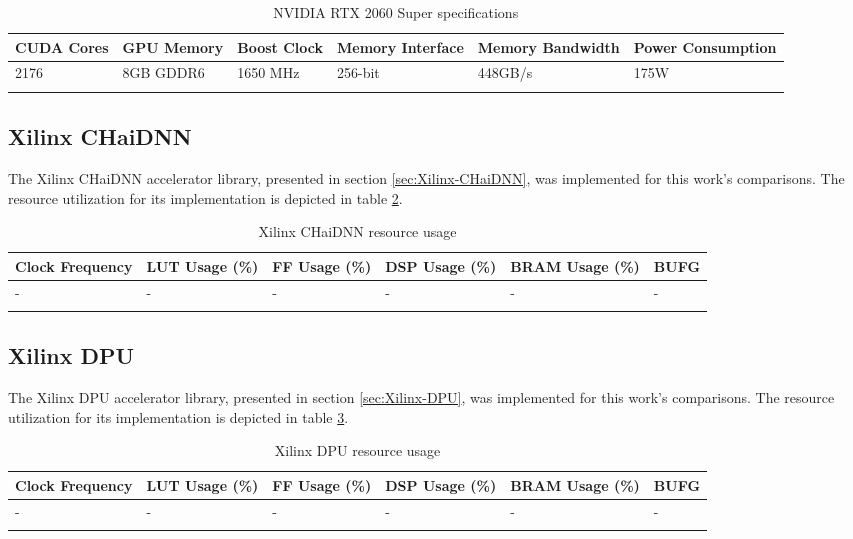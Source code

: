\begin{table}[H]
	\caption{NVIDIA RTX 2060 Super specifications}
	\label{tab:NVIDIA-RTX-2060-Super-specs}
	\centering
	\begin{tabular}{p{1cm} p{2cm} p{1cm} p{2cm} p{2.5cm} p{2.5cm}}
		\toprule
		\textbf{CUDA Cores} & \textbf{GPU Memory} & \textbf{Boost Clock} & \textbf{Memory Interface} & \textbf{Memory Bandwidth} & \textbf{Power Consumption}\\
		\midrule
			2176 & 8GB GDDR6 & 1650 MHz & 256-bit & 448GB/s & 175W\\
		\bottomrule\\
	\end{tabular}
\end{table}

\subsection{Xilinx CHaiDNN}
The Xilinx CHaiDNN accelerator library, presented in section \ref{sec:Xilinx-CHaiDNN}, was implemented for this work's comparisons. The resource utilization for its implementation is depicted in table \ref{tab:CHaiDNN-resource-usage}.

\begin{table}[H]
	\caption{Xilinx CHaiDNN resource usage}
	\label{tab:CHaiDNN-resource-usage}
	\centering
	\begin{tabular}{p{2cm} p{2cm} p{2cm} p{2cm} p{2cm} p{2cm}}
		\toprule
		\textbf{Clock Frequency} & \textbf{LUT Usage (\%)} & \textbf{FF Usage (\%)} & \textbf{DSP Usage (\%)} & \textbf{BRAM Usage (\%)} & \textbf{BUFG}\\
		\midrule
			- & - & - & - & - & -\\
		\bottomrule\\
	\end{tabular}
\end{table}

\subsection{Xilinx DPU}
The Xilinx DPU accelerator library, presented in section \ref{sec:Xilinx-DPU}, was implemented for this work's comparisons. The resource utilization for its implementation is depicted in table \ref{tab:DPU-resource-usage}.

\begin{table}[H]
	\caption{Xilinx DPU resource usage}
	\label{tab:DPU-resource-usage}
	\centering
	\begin{tabular}{p{2cm} p{2cm} p{2cm} p{2cm} p{2cm} p{2cm}}
		\toprule
		\textbf{Clock Frequency} & \textbf{LUT Usage (\%)} & \textbf{FF Usage (\%)} & \textbf{DSP Usage (\%)} & \textbf{BRAM Usage (\%)} & \textbf{BUFG}\\
		\midrule
			- & - & - & - & - & -\\
		\bottomrule\\
	\end{tabular}
\end{table}

